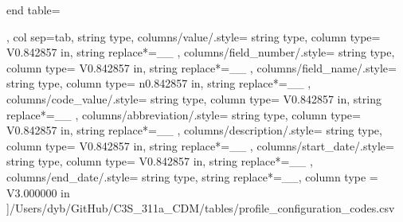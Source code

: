 \begin{landscape}
\begin{longtable}
    end table=\end{longtable},
    col sep=tab,
    string type,
    columns/value/.style={
            string type, 
            column type= V{0.842857 in}, 
            string replace*={_}{\_}
        },
    columns/field_number/.style={
            string type, 
            column type= V{0.842857 in}, 
            string replace*={_}{\_}
        },
    columns/field_name/.style={
            string type, 
            column type= n{0.842857 in}, 
            string replace*={_}{\_}
        },
    columns/code_value/.style={
            string type, 
            column type= V{0.842857 in}, 
            string replace*={_}{\_}
        },
    columns/abbreviation/.style={
            string type, 
            column type= V{0.842857 in}, 
            string replace*={_}{\_}
        },
    columns/description/.style={
            string type, 
            column type= V{0.842857 in}, 
            string replace*={_}{\_}
        },
    columns/start_date/.style={
            string type, 
            column type= V{0.842857 in}, 
            string replace*={_}{\_}
        },
    columns/end_date/.style={
            string type, 
            string replace*={_}{\_},
            column type = V{3.000000 in}
        }
    ]{/Users/dyb/GitHub/C3S_311a_CDM/tables/profile_configuration_codes.csv}
\end{landscape}

